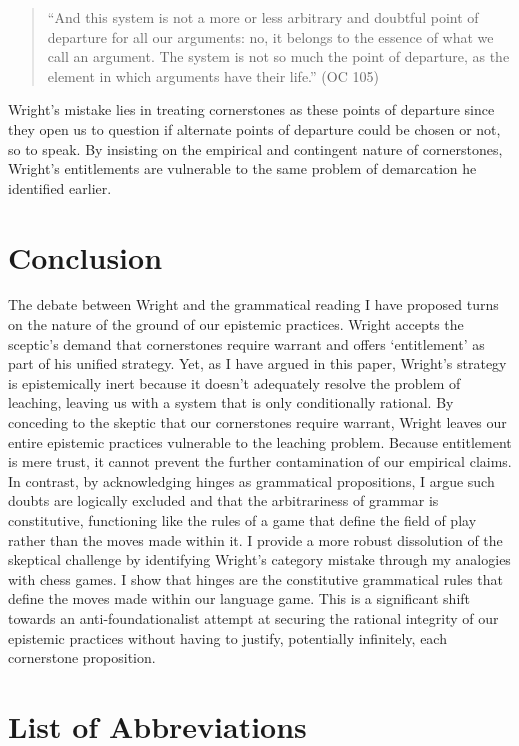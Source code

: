 \begin{quote}
``And this system is not a more or less arbitrary and doubtful point of
departure for all our arguments: no, it belongs to the essence of what
we call an argument. The system is not so much the point of departure,
as the element in which arguments have their life.'' (OC 105)
\end{quote}

\noindent Wright's mistake lies in treating cornerstones as these points of
departure since they open us to question if alternate points of
departure could be chosen or not, so to speak. By insisting on the
empirical and contingent nature of cornerstones, Wright's entitlements
are vulnerable to the same problem of demarcation he identified earlier.

\section{Conclusion}

The debate between Wright and the grammatical reading I have proposed
turns on the nature of the ground of our epistemic practices. Wright
accepts the sceptic's demand that cornerstones require warrant and
offers `entitlement' as part of his unified strategy. Yet, as I have
argued in this paper, Wright's strategy is epistemically inert because
it doesn't adequately resolve the problem of leaching, leaving us with a
system that is only conditionally rational. By conceding to the skeptic
that our cornerstones require warrant, Wright leaves our entire
epistemic practices vulnerable to the leaching problem. Because
entitlement is mere trust, it cannot prevent the further contamination
of our empirical claims. In contrast, by acknowledging hinges as
grammatical propositions, I argue such doubts are logically excluded and
that the arbitrariness of grammar is constitutive, functioning like the
rules of a game that define the field of play rather than the moves made
within it. I provide a more robust dissolution of the skeptical
challenge by identifying Wright's category mistake through my analogies
with chess games. I show that hinges are the constitutive grammatical
rules that define the moves made within our language game. This is a
significant shift towards an anti-foundationalist attempt at securing
the rational integrity of our epistemic practices without having to
justify, potentially infinitely, each cornerstone proposition.

\section*{List of Abbreviations}

